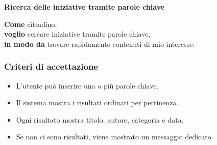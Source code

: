 \documentclass{article}
\begin{document}
\textbf{Ricerca delle iniziative tramite parole chiave}

\textbf{Come} cittadino,\\
\textbf{voglio} cercare iniziative tramite parole chiave,\\
\textbf{in modo da} trovare rapidamente contenuti di mio interesse.

\subsubsection{Criteri di accettazione}
\begin{itemize}
    \item L’utente può inserire una o più parole chiave.
    \item Il sistema mostra i risultati ordinati per pertinenza.
    \item Ogni risultato mostra titolo, autore, categoria e data.
    \item Se non ci sono risultati, viene mostrato un messaggio dedicato.
\end{itemize}
\end{document}
